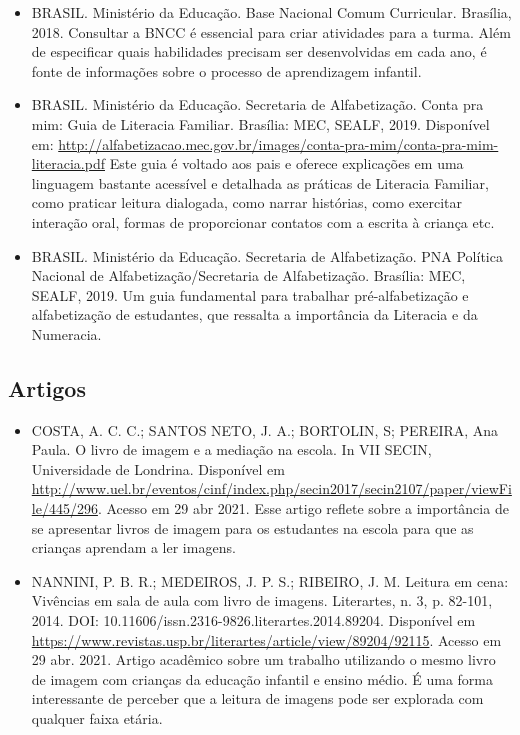\documentclass[11pt]{extarticle}
\begin{document}
\begin{itemize}
\item BRASIL. Ministério da Educação. Base Nacional Comum Curricular. Brasília, 2018.
Consultar a BNCC é essencial para criar atividades para a turma. Além de especificar 
quais habilidades precisam ser desenvolvidas em cada ano, é fonte de informações sobre 
o processo de aprendizagem infantil. 

\item BRASIL. Ministério da Educação. Secretaria de Alfabetização. Conta pra mim: Guia de Literacia Familiar. 
Brasília: MEC, SEALF, 2019. Disponível em: \url{http://alfabetizacao.mec.gov.br/images/conta-pra-mim/conta-pra-mim-literacia.pdf}
Este guia é voltado aos pais e oferece explicações em uma linguagem bastante acessível e detalhada as práticas de Literacia Familiar, 
como praticar leitura dialogada, como narrar histórias, como exercitar interação oral, formas de proporcionar contatos com a escrita à criança etc. 
 
\item BRASIL. Ministério da Educação. Secretaria de Alfabetização. PNA Política Nacional de Alfabetização/Secretaria 
de Alfabetização. Brasília: MEC, SEALF, 2019.
Um guia fundamental para trabalhar pré-alfabetização e alfabetização de estudantes, que ressalta a importância da Literacia e da Numeracia. 


\end{itemize}

\subsection{Artigos}

\begin{itemize}
\item COSTA, A. C. C.; SANTOS NETO, J. A.; BORTOLIN, S; PEREIRA, Ana Paula. O livro de imagem e a mediação na escola. 
In VII SECIN, Universidade de Londrina. Disponível em \url{http://www.uel.br/eventos/cinf/index.php/secin2017/secin2107/paper/viewFile/445/296}. 
Acesso em 29 abr 2021. 
Esse artigo reflete sobre a importância de se apresentar livros de imagem para os estudantes na escola para que as crianças aprendam a ler imagens. 

\item NANNINI, P. B. R.; MEDEIROS, J. P. S.; RIBEIRO, J. M. Leitura em cena: Vivências em sala de aula com livro de imagens. 
Literartes, n. 3, p. 82-101, 2014. DOI: 10.11606/issn.2316-9826.literartes.2014.89204. 
Disponível em \url{https://www.revistas.usp.br/literartes/article/view/89204/92115}. Acesso em 29 abr. 2021. 
Artigo acadêmico sobre um trabalho utilizando o mesmo livro de imagem com crianças da educação infantil e ensino médio. 
É uma forma interessante de perceber que a leitura de imagens pode ser explorada com qualquer faixa etária. 
\end{itemize}

% 
\end{document}
